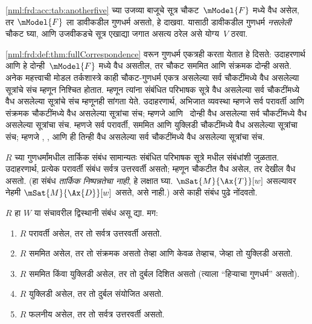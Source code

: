 \begin{prob}
\ref{nml:frd:acc:tab:anotherfive} च्या उजव्या
बाजूचे सूत्र चौकट~$\mModel{F}$ मध्ये वैध असेल,
तर $\mModel{F}$ ला डावीकडील गुणधर्म असतो, हे दाखवा.
यासाठी डावीकडील गुणधर्म \emph{नसलेली} चौकट घ्या,
आणि उजवीकडचे सूत्र एखाद्या जगात असत्य ठरेल
असे योग्य~$V$ ठरवा.
\end{prob}

\ref{nml:frd:def:thm:fullCorrespondence} वरून गुणधर्म एकत्रही
करता येतात हे दिसते: उदाहरणार्थ  आणि
 हे दोन्ही~$\mModel{F}$ मध्ये वैध असतील,
तर चौकट सममित आणि संक्रमक दोन्ही असते.
अनेक महत्त्वाची मोडल तर्कशास्त्रे काही चौकट-गुणधर्म
एकत्र असलेल्या सर्व चौकटींमध्ये वैध असलेल्या
सूत्रांचे संच म्हणून निश्चित होतात. म्हणून
त्यांना संबंधित परिभाषक सूत्रे वैध असलेल्या
सर्व चौकटींमध्ये वैध असलेल्या सूत्रांचे संच
म्हणूनही सांगता येते. उदाहरणार्थ, अभिजात व्यवस्था
 म्हणजे सर्व परावर्ती आणि संक्रमक चौकटींमध्ये
वैध असलेल्या सूत्रांचा संच; म्हणजे 
आणि~ दोन्ही वैध असलेल्या सर्व चौकटींमध्ये
वैध असलेल्या सूत्रांचा संच.
 म्हणजे सर्व परावर्ती, सममित आणि युक्लिडी
चौकटींमध्ये वैध असलेल्या सूत्रांचा संच; म्हणजे
, , आणि  ही तिन्ही वैध
असलेल्या सर्व चौकटींमध्ये वैध असलेल्या सूत्रांचा संच.

$R$ च्या गुणधर्मांमधील तार्किक संबंध सामान्यतः
संबंधित परिभाषक सूत्रे मधील संबंधांशी जुळतात.
उदाहरणार्थ, प्रत्येक परावर्ती संबंध सर्वत्र उत्तरवर्ती
असतो; म्हणून चौकटीत  वैध असेल, तर
 देखील वैध असतो. (हा संबंध \emph{तार्किक
निष्पन्नतेचा नाही}, हे लक्षात घ्या. $\mSat{M}{\Ax{T}}[w]$
असल्यावर नेहमी $\mSat{M}{\Ax{D}}[w]$ असते, असे
नाही.) असे काही संबंध पुढे नोंदवतो.

\begin{prop}\label{nml:frd:def:prop:relation-facts}
  $R$ हा $W$ या संचावरील द्विस्थानी संबंध असू द्या. मग:
  \begin{enumerate}
  \item $R$ परावर्ती असेल, तर तो सर्वत्र उत्तरवर्ती असतो.
  \item $R$ सममित असेल, तर तो संक्रमक असतो तेव्हा आणि
    केवळ तेव्हाच, जेव्हा तो युक्लिडी असतो.
  \item $R$ सममित किंवा युक्लिडी असेल, तर तो दुर्बल
    दिशित असतो (त्याला ``हिऱ्याचा गुणधर्म'' असतो).
  \item $R$ युक्लिडी असेल, तर तो दुर्बल संयोजित असतो.
  \item $R$ फलनीय असेल, तर तो सर्वत्र उत्तरवर्ती असतो.
  \end{enumerate}
\end{prop}

